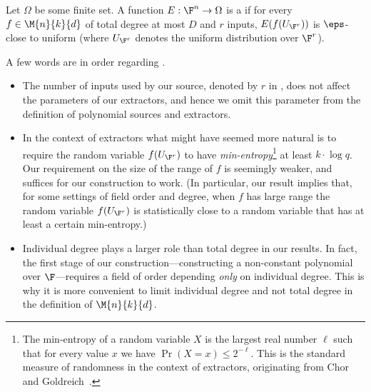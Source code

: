 %
%
\begin{definition}\label{dfn-polyext}
%
Let $\Omega$ be some finite set.
A function $E:\F^n\to \Omega$  is a \emph{} if for
every $f\in \M{n}{k}{d}$ of total degree at most $D$ and $r$ inputs,
$E(f(U_{\F^r}))$ is $\eps$-close to uniform
(where $U_{\F^r}$ denotes the uniform distribution
%
over $\F^r$).
%
%
%
%
%
\end{definition}
\begin{remark}
A few words are in order regarding .
\begin{itemize}
\item
%
%
%
 The number of inputs used by our source, denoted by $r$ in
 , does not affect the
%
%
parameters of our extractors, and hence
%
we omit this parameter from the definition of
polynomial sources and extractors.

\item In the context of extractors what might have seemed
more natural is to require the
%
%
%
%
random variable
$f(U_{\F^r})$ to have
\emph{min-entropy}\footnote{The min-entropy of a
%
%
%
random variable $X$ is
the largest %
real number $\ell$
such that for every
%
value $x$
we have %
%
%
%
$\Pr(X=x)\leq 2^{-{\ell}}$.
This is the standard measure of randomness in the context of extractors,
%
originating from Chor and Goldreich~\cite{CG88}.}
at least $k\cdot \log q$.
%
%
%
Our requirement on the size of the range of $f$ is seemingly weaker,
and suffices for our construction to work.
%
%
%
%
(In particular, our result implies that, for some settings of field order and degree, when $f$ has large range
the random variable $f(U_{\F^r})$ is statistically close to a random variable that has at least a certain min-entropy.)

\item Individual degree plays a larger role than total degree in our results.
%
  In fact, the first stage of our construction---constructing a
%
%
  non-constant polynomial over $\F$---requires a field of order
%
  depending \emph{only} on individual degree. This is why it is
  more convenient to limit individual degree and not total degree
  in the definition of $\M{n}{k}{d}$.

\end{itemize}
\end{remark}
